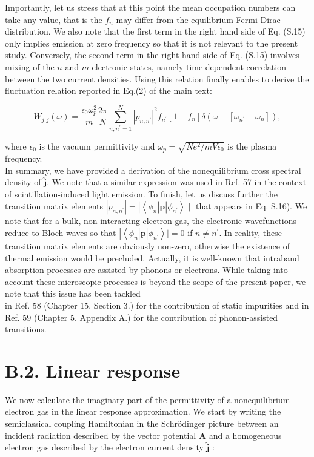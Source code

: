 \documentclass[10pt]{article}
\begin{document}
Importantly, let us stress that at this point the mean occupation numbers can take any value, that is the $f_{n}$ may differ from the equilibrium Fermi-Dirac distribution. We also note that the first term in the right hand side of Eq. (S.15) only implies emission at zero frequency so that it is not relevant to the present study. Conversely, the second term in the right hand side of Eq. (S.15) involves mixing of the $n$ and $m$ electronic states, namely time-dependent correlation between the two current densities. Using this relation finally enables to derive the fluctuation relation reported in Eq.(2) of the main text:


\begin{equation*}
W_{j^{\dagger} j}(\omega)=\frac{\epsilon_{0} \omega_{p}^{2}}{m} \frac{2 \pi}{N} \sum_{n, n^{\prime}=1}^{N}\left|p_{n, n^{\prime}}\right|^{2} f_{n^{\prime}}\left[1-f_{n}\right] \delta\left(\omega-\left[\omega_{n^{\prime}}-\omega_{n}\right]\right), \tag{S.16}
\end{equation*}


where $\epsilon_{0}$ is the vacuum permittivity and $\omega_{p}=\sqrt{N e^{2} / m V \epsilon_{0}}$ is the plasma frequency.\\
In summary, we have provided a derivation of the nonequilibrium cross spectral density of $\hat{\boldsymbol{j}}$. We note that a similar expression was used in Ref. 57 in the context of scintillation-induced light emission. To finish, let us discuss further the transition matrix elements $\left|p_{n, n^{\prime}}\right|= \left.\left|\left\langle\phi_{n}\right| \mathbf{p}\right| \phi_{n^{\prime}}\right\rangle \mid$ that appears in Eq. S.16). We note that for a bulk, non-interacting electron gas, the electronic wavefunctions reduce to Bloch waves so that $\left.\left|\left\langle\phi_{n}\right| \mathbf{p}\right| \phi_{n^{\prime}}\right\rangle \mid=0$ if $n \neq n^{\prime}$. In reality, these transition matrix elements are obviously non-zero, otherwise the existence of thermal emission would be precluded. Actually, it is well-known that intraband absorption processes are assisted by phonons or electrons. While taking into account these microscopic processes is beyond the scope of the present paper, we note that this issue has been tackled\\
in Ref. 58 (Chapter 15. Section 3.) for the contribution of static impurities and in Ref. 59 (Chapter 5. Appendix A.) for the contribution of phonon-assisted transitions.

\section*{B.2. Linear response}
We now calculate the imaginary part of the permittivity of a nonequilibrium electron gas in the linear response approximation. We start by writing the semiclassical coupling Hamiltonian in the Schrödinger picture between an incident radiation described by the vector potential $\boldsymbol{A}$ and a homogeneous electron gas described by the electron current density $\hat{\boldsymbol{j}}$ :
\end{document}

